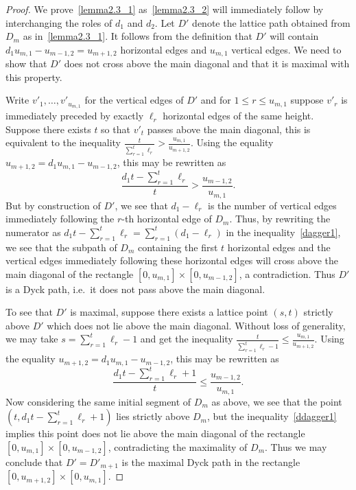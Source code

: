 \documentclass[10pt]{amsart}
\theoremstyle{definition}
\newcommand{\ie}{i.e.\ }
\begin{document}
\begin{proof}
 We prove~\ref{lemma2.3_1} as~\ref{lemma2.3_2} will immediately follow by interchanging the roles of $d_1$ and $d_2$. 
 Let $D'$ denote the lattice path obtained from $D_m$ as in~\ref{lemma2.3_1}. 
 It follows from the definition that $D'$ will contain $d_1u_{m,1}-u_{m-1,2}=u_{m+1,2}$ horizontal edges and $u_{m,1}$ vertical edges. 
 We need to show that $D'$ does not cross above the main diagonal and that it is maximal with this property. 

 Write $v'_1,\ldots,v'_{u_{m,1}}$ for the vertical edges of $D'$ and for $1\le r\le u_{m,1}$ suppose $v'_r$ is immediately preceded by exactly $\ell_r$ horizontal edges of the same height.
 Suppose there exists $t$ so that $v'_t$ passes above the main diagonal, this is equivalent to the inequality $\frac{t}{\sum\limits_{r=1}^t\ell_r}>\frac{u_{m,1}}{u_{m+1,2}}$. 
 Using the equality $u_{m+1,2}=d_1u_{m,1}-u_{m-1,2}$, this may be rewritten as 
 \begin{equation}\label{dagger1}
 \tag{$\dagger$}\frac{d_1t-\sum\limits_{r=1}^t\ell_r}{t}>\frac{u_{m-1,2}}{u_{m,1}}.
 \end{equation}
 But by construction of $D'$, we see that $d_1-\ell_r$ is the number of vertical edges immediately following the $r$-th horizontal edge of $D_m$. 
 Thus, by rewriting the numerator as $d_1t-\sum\limits_{r=1}^t\ell_r=\sum\limits_{r=1}^t(d_1-\ell_r)$ in the inequality~\eqref{dagger1}, we see that the subpath of $D_m$ containing the first $t$ horizontal edges and the vertical edges immediately following these horizontal edges will cross above the main diagonal of the rectangle $[0,u_{m,1}]\times[0,u_{m-1,2}]$, a contradiction. 
 Thus $D'$ is a Dyck path, \ie it does not pass above the main diagonal.

 To see that $D'$ is maximal, suppose there exists a lattice point $(s,t)$ strictly above $D'$ which does not lie above the main diagonal. 
 Without loss of generality, we may take $s=\sum\limits_{r=1}^t\ell_r-1$ and get the inequality $\frac{t}{\sum\limits_{r=1}^t\ell_r-1}\le\frac{u_{m,1}}{u_{m+1,2}}$. 
 Using the equality $u_{m+1,2}=d_1u_{m,1}-u_{m-1,2}$, this may be rewritten as
 \begin{equation}\label{ddagger1}
 \tag{$\ddagger$}\frac{d_1t-\sum\limits_{r=1}^t\ell_r+1}{t}\le\frac{u_{m-1,2}}{u_{m,1}}.
 \end{equation}
 Now considering the same initial segment of $D_m$ as above, we see that the point $(t,d_1t-\sum\limits_{r=1}^t\ell_r+1)$ lies strictly above $D_m$, but the inequality~\eqref{ddagger1} implies this point does not lie above the main diagonal of the rectangle $[0,u_{m,1}]\times[0,u_{m-1,2}]$, contradicting the maximality of $D_m$. 
 Thus we may conclude that $D'=D'_{m+1}$ is the maximal Dyck path in the rectangle $[0,u_{m+1,2}]\times[0,u_{m,1}]$.
\end{proof}
\end{document}

